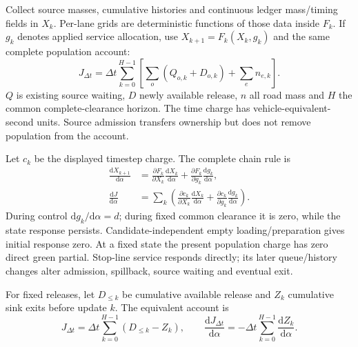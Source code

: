 \documentclass[10pt,a4paper]{article}
\newenvironment{revision}{\begingroup\color{revisionred}}{\par\endgroup}
\begin{document}
\begin{revision}
Collect source masses, cumulative histories and continuous ledger
mass/timing fields in $X_k$. Per-lane grids are deterministic functions
of those data inside $F_k$. If $g_k$ denotes applied service allocation,
use $X_{k+1}=F_k(X_k,g_k)$ and the same complete population account:
\begin{equation}
 J_{\Delta t}=\Delta t\sum_{k=0}^{H-1}
 \left[\sum_o(Q_{o,k}+D_{o,k})+\sum_en_{e,k}\right].
 \label{eq:tst}
\end{equation}
$Q$ is existing source waiting, $D$ newly available release, $n$ all road
mass and $H$ the common complete-clearance horizon. The time charge has
vehicle-equivalent-second units. Source admission transfers ownership but
does not remove population from the account.

Let $c_k$ be the displayed timestep charge. The complete chain rule is
\begin{equation}
 \begin{aligned}
 \frac{\mathrm dX_{k+1}}{\mathrm d\alpha}
 &=\frac{\partial F_k}{\partial X_k}
            \frac{\mathrm dX_k}{\mathrm d\alpha}
  +\frac{\partial F_k}{\partial g_k}
            \frac{\mathrm dg_k}{\mathrm d\alpha},\\
 \frac{\mathrm dJ}{\mathrm d\alpha}
 &=\sum_k\left(
 \frac{\partial c_k}{\partial X_k}\frac{\mathrm dX_k}{\mathrm d\alpha}
 +\frac{\partial c_k}{\partial g_k}\frac{\mathrm dg_k}{\mathrm d\alpha}
 \right).
 \end{aligned}
 \label{eq:state-sensitivity}
\end{equation}
During control $\mathrm dg_k/\mathrm d\alpha=d$; during fixed common
clearance it is zero, while the state response persists. Candidate-independent
empty loading/preparation gives initial response zero. At a fixed state
the present population charge has zero direct green partial. Stop-line
service responds directly; its later queue/history changes alter admission,
spillback, source waiting and eventual exit.

For fixed releases, let $D_{\leq k}$ be cumulative available release and
$Z_k$ cumulative sink exits before update $k$. The equivalent account is
\begin{equation}
 J_{\Delta t}=\Delta t\sum_{k=0}^{H-1}(D_{\leq k}-Z_k),\qquad
 \frac{\mathrm dJ_{\Delta t}}{\mathrm d\alpha}
 =-\Delta t\sum_{k=0}^{H-1}\frac{\mathrm dZ_k}{\mathrm d\alpha}.
 \label{eq:exit-objective}
\end{equation}
\end{revision}
\end{document}
